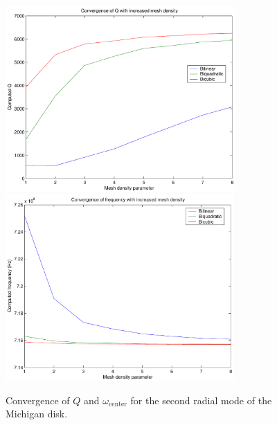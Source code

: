 \documentclass{article}
\begin{document}
\begin{figure}
\includegraphics[height=2.8in]{Qconverge.pdf}
\includegraphics[height=2.8in]{wconverge.pdf}
\caption{Convergence of $Q$ and $\omega_\mathrm{center}$ for the second
         radial mode of the Michigan disk.}
\label{converge-fig}
\end{figure}
\end{document}
